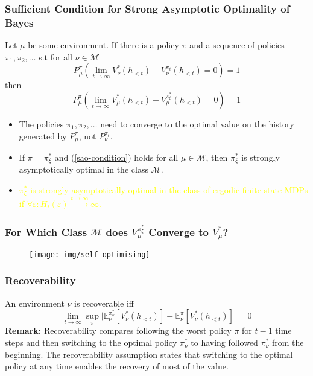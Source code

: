 \documentclass[UTF8,11pt,colorlinks,compress,openany]{beamer}%
\begin{document}
\begin{frame}\frametitle{\small Sufficient Condition for Strong Asymptotic Optimality of Bayes}\vspace{-1ex}
	\begin{theorem}
		Let $\mu$ be some environment. If there is a policy $\pi$ and a sequence of policies $\pi_1,\pi_2,\dots$ s.t for all $\nu\in\mathcal{M}$
		\begin{equation}
		P_\mu^\pi\left(\lim\limits_{t\to\infty} V_\nu^*(h_{<t})-V_\nu^{\pi_t}(h_{<t})=0\right)=1\label{sao-condition}
		\end{equation}
		then
		\[P_\mu^\pi\left(\lim\limits_{t\to\infty} V_\mu^*(h_{<t})-V_\mu^{\pi_\xi^*}(h_{<t})=0\right)=1\]
	\end{theorem}\vspace{-1ex}
	\begin{itemize}
		\item The policies $\pi_1,\pi_2,\dots$ need to converge to the optimal value on the history generated by $P_\mu^\pi$, not $P_\nu^{\pi_t}$.
		\item If $\pi=\pi_\xi^*$ and (\ref{sao-condition}) holds for all $\mu\in\mathcal{M}$, then $\pi_\xi^*$ is strongly asymptotically optimal in the class $\mathcal{M}$.
		\item \textcolor{yellow}{$\pi_\xi^*$ is strongly asymptotically optimal in the class of ergodic finite-state MDPs if $\forall \varepsilon: H_t(\varepsilon)\xrightarrow{t\to\infty}\infty$.}
	\end{itemize}
\end{frame}

\begin{frame}\frametitle{For Which Class $\mathcal{M}$ does $V_\mu^{\pi_\xi^*}$ Converge to $V_\mu^*$?}
	\begin{figure}
	\texttt{[image: img/self-optimising]}
	\end{figure}
\end{frame}

\begin{frame}\frametitle{Recoverability}
	An environment $\nu$ is recoverable iff
	\[\lim\limits_{t\to\infty}\sup\limits_\pi\Big|\mathbb{E}_\nu^{\pi_\nu^*}\left[V_\nu^*(h_{<t})\right]-\mathbb{E}_\nu^\pi\left[V_\nu^*(h_{<t})\right]\Big|=0\]
	\textbf{Remark:} Recoverability compares following the worst policy $\pi$ for $t-1$ time steps and then
	switching to the optimal policy $\pi_\nu^*$ to having followed $\pi_\nu^*$ from the beginning. The recoverability assumption states that switching to the optimal policy at any time enables the recovery of most of the value.
\end{frame}
\end{document}
